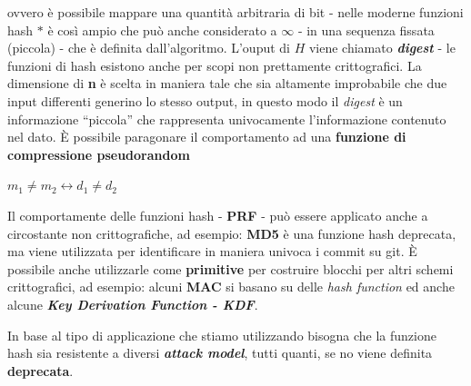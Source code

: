 \begin{flushleft}
    ovvero è possibile mappare una quantità arbitraria di bit - nelle moderne funzioni hash $*$ è così ampio che può anche considerato a $\infty$ - in una sequenza fissata (piccola) - che è definita dall'algoritmo. L'ouput di $H$ viene chiamato \textbf{\textit{digest}} - le funzioni di hash esistono anche per scopi non prettamente crittografici. La dimensione di \textbf{n} è scelta in maniera tale che sia altamente improbabile che due input differenti generino lo stesso output, in questo modo il \textit{digest} è un informazione ``piccola'' che rappresenta univocamente l'informazione contenuto nel dato. È possibile paragonare il comportamento ad una \textbf{funzione di compressione pseudorandom}

    {\centering
        $m_1 \neq m_2 \longleftrightarrow d_1 \neq d_2$
    \par}

    Il comportamente delle funzioni hash - \textbf{PRF} - può essere applicato anche a circostante non crittografiche, ad esempio: \textbf{MD5} è una funzione hash deprecata, ma viene utilizzata per identificare in maniera univoca i commit su git. È possibile anche utilizzarle come \textbf{primitive} per costruire blocchi per altri schemi crittografici, ad esempio: alcuni \textbf{MAC} si basano su delle \textit{hash function} ed anche alcune \textbf{\textit{Key Derivation Function - KDF}}.

    \medskip

    In base al tipo di applicazione che stiamo utilizzando bisogna che la funzione hash sia resistente a diversi \textbf{\textit{attack model}}, tutti quanti, se no viene definita \textbf{deprecata}.


\end{flushleft}
